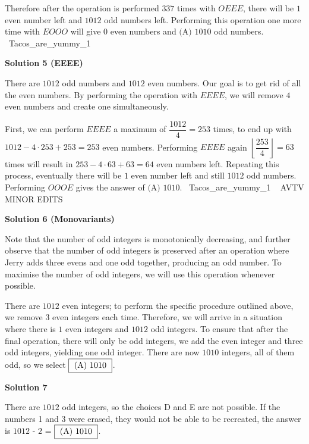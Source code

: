 \begin{enumerate}
 Therefore after the operation is performed $337$ times with $OEEE$, there will be $1$ even number left and $1012$ odd numbers left. Performing this operation one more time with $EOOO$ will give $0$ even numbers and $\boxed{\text{(A) }1010}$ odd numbers. ~Tacos\_are\_yummy\_1

 



\textbf{Solution 5 (EEEE)}

There are $1012$ odd numbers and $1012$ even numbers. Our goal is to get rid of all the even numbers. By performing the operation with $EEEE$, we will remove $4$ even numbers and create one simultaneously.

 First, we can perform $EEEE$ a maximum of $\dfrac{1012}{4}=253$ times, to end up with $1012-4\cdot253+253=253$ even numbers. Performing $EEEE$ again $\left\lfloor{\dfrac{253}{4}}\right\rfloor=63$ times will result in $253-4\cdot63+63=64$ even numbers left. Repeating this process, eventually there will be $1$ even number left and still $1012$ odd numbers. Performing $OOOE$ gives the answer of $\boxed{\text{(A) }1010}$. ~Tacos\_are\_yummy\_1 ~ AVTV MINOR EDITS

 



\textbf{Solution 6 (Monovariants)}

Note that the number of odd integers is monotonically decreasing, and further observe that the number of odd integers is preserved after an operation where Jerry adds three evens and one odd together, producing an odd number. To maximise the number of odd integers, we will use this operation whenever possible.

 There are $1012$ even integers; to perform the specific procedure outlined above, we remove $3$ even integers each time. Therefore, we will arrive in a situation where there is $1$ even integers and $1012$ odd integers. To ensure that after the final operation, there will only be odd integers, we add the even integer and three odd integers, yielding one odd integer. There are now $1010$ integers, all of them odd, so we select $\fbox{ (A) 1010 }$.

 



\textbf{Solution 7}

There are $1012$ odd integers, so the choices D and E are not possible. If the numbers 1 and 3 were erased, they would not be able to be recreated, the answer is $1012$ - $2$ = $\fbox{ (A) 1010 }$.


\end{enumerate}
